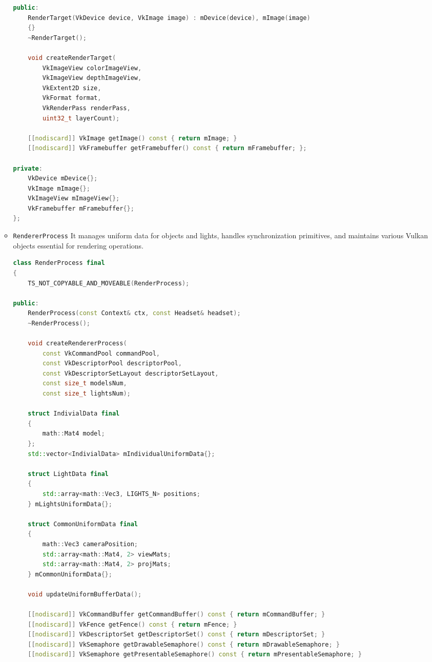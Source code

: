 \begin{itemize}
\begin{itemize}
\begin{lstlisting}[language=c++, caption=\texttt{RenderTarget} class (./engine/src/core/render\_target.h)]
public:
    RenderTarget(VkDevice device, VkImage image) : mDevice(device), mImage(image)
    {}
    ~RenderTarget();

    void createRenderTarget(
        VkImageView colorImageView,
        VkImageView depthImageView,
        VkExtent2D size,
        VkFormat format,
        VkRenderPass renderPass,
        uint32_t layerCount);

    [[nodiscard]] VkImage getImage() const { return mImage; }
    [[nodiscard]] VkFramebuffer getFramebuffer() const { return mFramebuffer; };

private:
    VkDevice mDevice{};
    VkImage mImage{};
    VkImageView mImageView{};
    VkFramebuffer mFramebuffer{};
};
\end{lstlisting}
    \item \texttt{RendererProcess}
    It manages uniform data for objects and lights, handles synchronization primitives, and maintains various Vulkan objects essential for rendering operations.
\begin{lstlisting}[language=c++, caption=\texttt{RendererProcess} class (./engine/src/core/renderer\_process.h)]
class RenderProcess final
{
    TS_NOT_COPYABLE_AND_MOVEABLE(RenderProcess);

public:
    RenderProcess(const Context& ctx, const Headset& headset);
    ~RenderProcess();

    void createRendererProcess(
        const VkCommandPool commandPool,
        const VkDescriptorPool descriptorPool,
        const VkDescriptorSetLayout descriptorSetLayout,
        const size_t modelsNum,
        const size_t lightsNum);

    struct IndivialData final
    {
        math::Mat4 model;
    };
    std::vector<IndivialData> mIndividualUniformData{};
    
    struct LightData final
    {
        std::array<math::Vec3, LIGHTS_N> positions;
    } mLightsUniformData{};

    struct CommonUniformData final
    {
        math::Vec3 cameraPosition;
        std::array<math::Mat4, 2> viewMats;
        std::array<math::Mat4, 2> projMats;
    } mCommonUniformData{};

    void updateUniformBufferData();

    [[nodiscard]] VkCommandBuffer getCommandBuffer() const { return mCommandBuffer; }
    [[nodiscard]] VkFence getFence() const { return mFence; }
    [[nodiscard]] VkDescriptorSet getDescriptorSet() const { return mDescriptorSet; }
    [[nodiscard]] VkSemaphore getDrawableSemaphore() const { return mDrawableSemaphore; }
    [[nodiscard]] VkSemaphore getPresentableSemaphore() const { return mPresentableSemaphore; }


\end{lstlisting}
\end{itemize}
\end{itemize}

